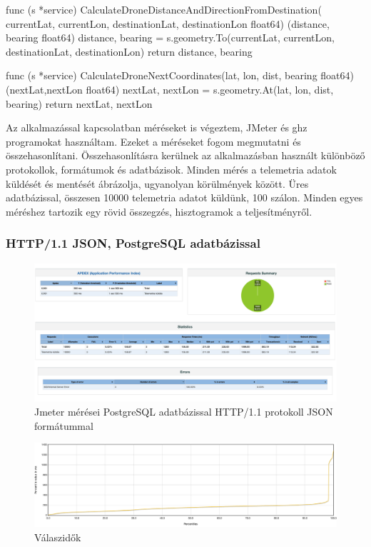 \begin{python}
    func (s *service) CalculateDroneDistanceAndDirectionFromDestination(
    currentLat, currentLon, destinationLat, destinationLon float64)
    (distance, bearing float64) {
        distance, bearing = s.geometry.To(currentLat,
        currentLon, destinationLat, destinationLon)
        return distance, bearing
    }

    func (s *service) CalculateDroneNextCoordinates(lat, lon,
    dist, bearing float64) (nextLat,nextLon float64) {
        nextLat, nextLon = s.geometry.At(lat, lon, dist, bearing)
        return nextLat, nextLon
    }
\end{python}


Az alkalmazással kapcsolatban méréseket is végeztem, JMeter\cite{apache}  és ghz\cite{ghz} programokat használtam.
Ezeket a méréseket fogom megmutatni és összehasonlítani.
Összehasonlításra kerülnek az alkalmazásban használt különböző protokollok, formátumok és adatbázisok.
Minden mérés a telemetria adatok küldését és mentését ábrázolja, ugyanolyan körülmények között.
Üres adatbázissal, összesen 10000 telemetria adatot küldünk, 100 szálon.
Minden egyes méréshez tartozik egy rövid összegzés, hisztogramok a teljesítményről.

\subsubsection{HTTP/1.1 JSON, PostgreSQL adatbázissal}
\begin{figure}[hbt!]
    \centering
    \includegraphics[scale=0.2]{images/jmeter-json-postgres}
    \caption{Jmeter mérései PostgreSQL adatbázissal HTTP/1.1 protokoll JSON formátummal}
    \label{fig:jmeter-json-postgres}
\end{figure}

\begin{figure}[hbt!]
    \centering
    \includegraphics[scale=0.3]{images/json-postgres-response-times}
    \caption{Válaszidők}
    \label{fig:json-postgres-response-times}
\end{figure}

